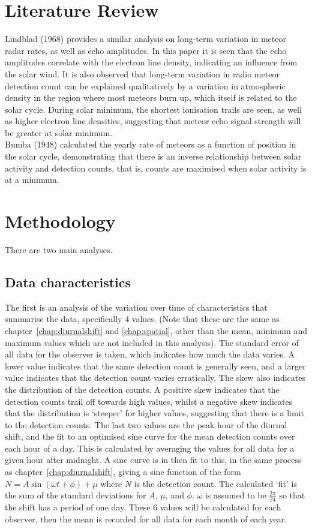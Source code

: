 \section{Literature Review}
\label{sec:temp:litrev}
Lindblad (1968) \cite{lindblad} provides a similar analysis on long-term variation in meteor radar rates, as well as echo amplitudes. In this paper it is seen that the echo amplitudes correlate with the electron line density, indicating an influence from the solar wind. It is also observed that long-term variation in radio meteor detection count can be explained qualitatively by a variation in atmospheric density in the region where most meteors burn up, which itself is related to the solar cycle. During solar minimum, the shortest ionisation trails are seen, as well as higher electron line densities, suggesting that meteor echo signal strength will be greater at solar minimum.\\
Bumba (1948) \cite{bumba} calculated the yearly rate of meteors as a function of position in the solar cycle, demonstrating that there is an inverse relationship between solar activity and detection counts, that is, counts are maximised when solar activity is at a minimum.
\section{Methodology}
There are two main analyses. 
\subsection{Data characteristics}
The first is an analysis of the variation over time of characteristics that summarise the data, specifically 4 values. (Note that these are the same as chapter~\ref{chap:diurnalshift} and \ref{chap:spatial}, other than the mean, minimum and maximum values which are not included in this analysis). The standard error of all data for the observer is taken, which indicates how much the data varies. A lower value indicates that the same detection count is generally seen, and a larger value indicates that the detection count varies erratically. The skew also indicates the distribution of the detection counts. A positive skew indicates that the detection counts trail off towards high values, whilst a negative skew indicates that the distribution is `steeper' for higher values, suggesting that there is a limit to the detection counts. The last two values are the peak hour of the diurnal shift, and the fit to an optimised sine curve for the mean detection counts over each hour of a day. This is calculated by averaging the values for all data for a given hour after midnight. A sine curve is in then fit to this, in the same process as chapter~\ref{chap:diurnalshift}, giving a sine function of the form $N = A \sin \left( \omega t + \phi \right) + \mu$ where $N$ is the detection count. The calculated `fit' is the sum of the standard deviations for $A$, $\mu$, and $\phi$. $\omega$ is assumed to be $\frac{2\pi}{24}$ so that the shift has a period of one day. These 6 values will be calculated for each observer, then the mean is recorded for all data for each month of each year.
